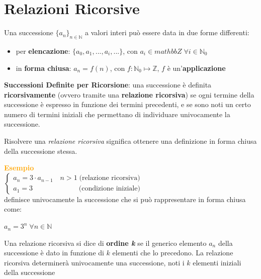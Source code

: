 \chapter{Relazioni Ricorsive}

\begin{flushleft}
    Una successione $\{a_n\}_{n \in \mathbb{N}}$ a valori interi può essere data in due forme differenti:
    \begin{itemize}[nosep]
        \item per \textbf{elencazione}: $\{a_0, a_1, ..., a_i, ...\}$, con $a_i \in mathbb{Z} \; \forall i \in \mathbb{N}_0$
        \item in \textbf{forma chiusa}: $a_n = f(n)$, con $f : \mathbb{N}_0 \mapsto \mathbb{Z}$, $f$ è un'\textbf{applicazione}
    \end{itemize}

    \textbf{Successioni Definite per Ricorsione}: una successione è definita \textbf{ricorsivamente} (ovvero tramite una \textbf{relazione ricorsiva}) se ogni termine della successione è espresso in funzione dei termini precedenti, e se sono noti un certo numero di termini iniziali che permettano di individuare univocamente la successione.

    Risolvere una \textit{relazione ricorsiva} significa ottenere una definizione in forma chiusa della successione stessa.

    \begin{boxA}
        \textcolor{orange}{\textbf{Esempio}} \\
        $\begin{cases}
            a_n = 3 \cdot a_{n - 1} \quad n > 1 \; \text{(relazione ricorsiva)} \\
            a_1 = 3 \qquad \qquad \qquad \;\; \text{(condizione iniziale)}
        \end{cases}$ \\
        definisce univocamente la successione  che si può rappresentare in forma chiusa come:

        {\centering
            $a_n = 3^n \; \forall n \in \mathbb{N}$
        \par}
    \end{boxA}

    Una relazione ricorsiva si dice di \textbf{ordine \textit{k}} se il generico elemento $a_n$ della successione è dato in funzione di $k$ elementi che lo precedono. La relazione ricorsiva determinerà univocamente una successione, noti i $k$ elementi iniziali della successione


\end{flushleft}
